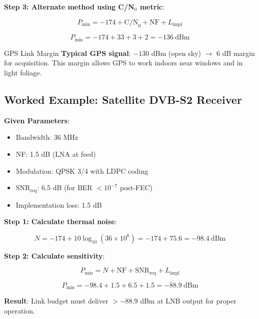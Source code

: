 \textbf{Step 3: Alternate method using C/N$_0$ metric}:

\begin{equation}
P_{\text{min}} = -174 + \text{C/N}_0 + \text{NF} + L_{\text{impl}}
\end{equation}

\begin{equation}
P_{\text{min}} = -174 + 33 + 3 + 2 = -136~\text{dBm}
\end{equation}

\begin{calloutbox}{GPS Link Margin}
\textbf{Typical GPS signal}: $-130$ dBm (open sky) $\rightarrow$ 6 dB margin for acquisition. This margin allows GPS to work indoors near windows and in light foliage.
\end{calloutbox}

\subsection{Worked Example: Satellite DVB-S2 Receiver}

\textbf{Given Parameters}:
\begin{itemize}
\item Bandwidth: 36 MHz
\item NF: 1.5 dB (LNA at feed)
\item Modulation: QPSK 3/4 with LDPC coding
\item $\text{SNR}_{\text{req}}$: 6.5 dB (for BER $< 10^{-7}$ post-FEC)
\item Implementation loss: 1.5 dB
\end{itemize}

\textbf{Step 1: Calculate thermal noise}:

\begin{equation}
N = -174 + 10\log_{10}(36 \times 10^6) = -174 + 75.6 = -98.4~\text{dBm}
\end{equation}

\textbf{Step 2: Calculate sensitivity}:

\begin{equation}
P_{\text{min}} = N + \text{NF} + \text{SNR}_{\text{req}} + L_{\text{impl}}
\end{equation}

\begin{equation}
P_{\text{min}} = -98.4 + 1.5 + 6.5 + 1.5 = -88.9~\text{dBm}
\end{equation}

\textbf{Result}: Link budget must deliver $> -88.9$ dBm at LNB output for proper operation.

